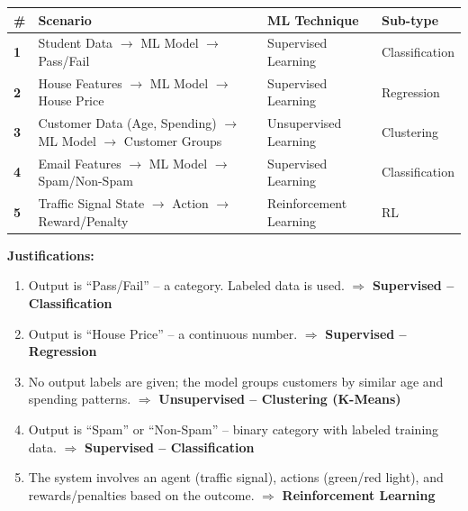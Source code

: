 \documentclass[12pt,a4paper]{article}
\newcommand{\term}[1]{\textbf{\color{headingcolor}#1}}
\begin{document}
\begin{answerenv}

\begin{center}
\begin{tabular}{>{\bfseries}p{0.5cm} p{6cm} p{3.5cm} p{3cm}}
\toprule
\textbf{\#} & \textbf{Scenario} & \textbf{ML Technique} & \textbf{Sub-type} \\
\midrule
1 & Student Data $\to$ ML Model $\to$ Pass/Fail & Supervised Learning & Classification \\[4pt]
2 & House Features $\to$ ML Model $\to$ House Price & Supervised Learning & Regression \\[4pt]
3 & Customer Data (Age, Spending) $\to$ ML Model $\to$ Customer Groups & Unsupervised Learning & Clustering \\[4pt]
4 & Email Features $\to$ ML Model $\to$ Spam/Non-Spam & Supervised Learning & Classification \\[4pt]
5 & Traffic Signal State $\to$ Action $\to$ Reward/Penalty & Reinforcement Learning & RL \\
\bottomrule
\end{tabular}
\end{center}

\vspace{6pt}
\textbf{\color{headingcolor}Justifications:}
\begin{enumerate}[leftmargin=1.8em, itemsep=4pt]
  \item Output is ``Pass/Fail'' -- a category. Labeled data is used. $\Rightarrow$ \term{Supervised -- Classification}
  \item Output is ``House Price'' -- a continuous number. $\Rightarrow$ \term{Supervised -- Regression}
  \item No output labels are given; the model groups customers by similar age and spending patterns. $\Rightarrow$ \term{Unsupervised -- Clustering (K-Means)}
  \item Output is ``Spam'' or ``Non-Spam'' -- binary category with labeled training data. $\Rightarrow$ \term{Supervised -- Classification}
  \item The system involves an agent (traffic signal), actions (green/red light), and rewards/penalties based on the outcome. $\Rightarrow$ \term{Reinforcement Learning}
\end{enumerate}

\end{answerenv}

\vspace{8pt}
\end{document}
